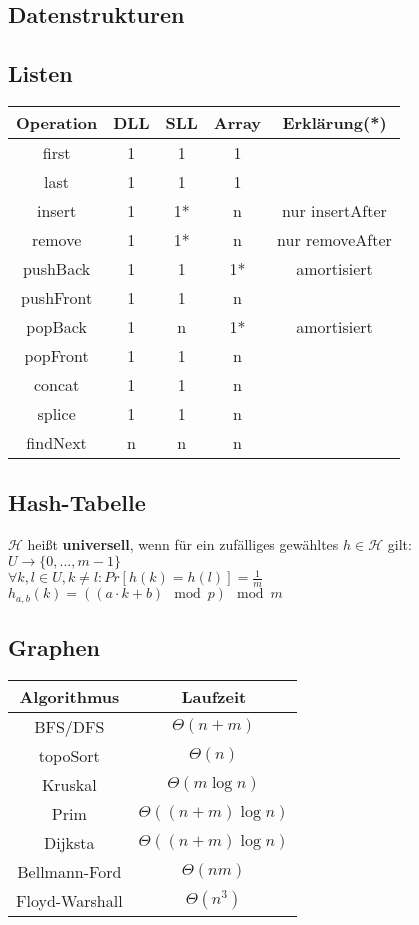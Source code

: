 \documentclass[11pt, a4paper, twoside]{article}
\begin{document}
\begin{multicols}{2}

    \section{Datenstrukturen}

    \subsection{Listen}

    \begin{tabular}{c || c | c | c || c}
        Operation & DLL & SLL & Array & Erklärung(*) \\
        \hline
        first & 1 & 1 & 1 & \\
        last & 1 & 1 & 1 & \\ 
        insert & 1 & 1* & n & nur insertAfter \\
        remove & 1 & 1* & n & nur removeAfter \\
        pushBack & 1 & 1 & 1* & amortisiert \\
        pushFront & 1 & 1 & n & \\
        popBack & 1 & n & 1* & amortisiert \\
        popFront & 1 & 1 & n & \\
        concat & 1 & 1 & n & \\
        splice & 1 & 1 & n \\
        findNext & n & n & n 

    \end{tabular}

    \subsection{Hash-Tabelle}
    $\mathcal{H}$ heißt \textbf{universell}, wenn für ein zufälliges gewähltes
    $h \in \mathcal{H}$ gilt: $U \rightarrow \{0, ..., m-1\}$ \\
    $\forall k, l \in U, k \neq l: Pr[h(k) = h(l)] = \frac{1}{m}$ \\
    $h_{a,b}(k) = ((a\cdot k + b) \mod p) \mod m$

    \subsection{Graphen}

    \begin{tabular}{c || c}
        Algorithmus & Laufzeit \\
        \hline
        BFS/DFS & $\Theta(n+m)$\\
        topoSort & $\Theta(n)$\\
        Kruskal & $\Theta(m \log n)$\\
        Prim & $\Theta((n+m)\log n)$ \\
        Dijksta & $\Theta((n + m) \log n)$\\
        Bellmann-Ford & $\Theta(nm)$\\
        Floyd-Warshall & $\Theta(n^3)$ \\
    \end{tabular}


\end{multicols}
\end{document}
